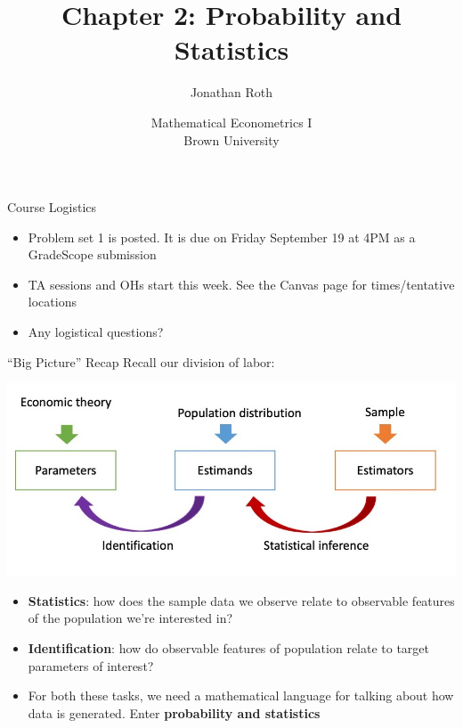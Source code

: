 \documentclass[11pt,english,handout]{beamer}
\begin{document}
\begin{frame}[noframenumbering]{}
\vspace{0.5cm}
\title[]{Chapter 2: Probability and Statistics}
\author{Jonathan Roth}
\date{Mathematical Econometrics I \\ Brown University \\ } 
\titlepage {\small{}\ }\thispagestyle{empty} \vspace{-30pt}

\end{frame}
 
\begin{frame}{Course Logistics}

\begin{itemize}
\item
Problem set 1 is posted. It is due on Friday September 19 at 4PM as a GradeScope submission
\bigskip

\item
TA sessions and OHs start this week. See the Canvas page for times/tentative locations
\bigskip

\item
Any logistical questions?
\end{itemize}	
\end{frame}



\begin{frame}{``Big Picture'' Recap}
\vspace{0.1cm}
Recall our division of labor:
\begin{center}
\includegraphics[width=0.9\linewidth]{BigPicture.jpg}
\end{center}
\vspace{-0.2cm}

\begin{itemize}
\item
\textbf{Statistics}: how does the sample data we observe relate to observable features of the population we're interested in? 
\smallskip

\item
\textbf{Identification}: how do observable features of population relate to target parameters of interest? 
\smallskip
\pause{}

\item
For both these tasks, we need a mathematical language for talking about how data is generated. Enter \textbf{probability and statistics}


\end{itemize}

\end{frame}
\end{document}
